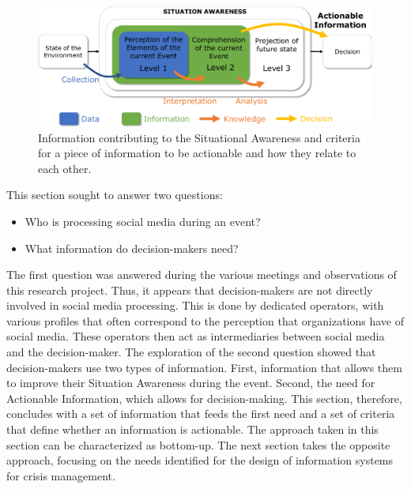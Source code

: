 \begin{figure}[htb]
    \centering
    \includegraphics[width=\textwidth]{figures/chap-3/inf-need-dm.pdf}
    \caption{Information contributing to the Situational Awareness and criteria for a piece of information to be actionable and how they relate to each other.}
    \label{information:sa-inf}
\end{figure}

This section sought to answer two questions:

\begin{itemize}
    \item Who is processing social media during an event?
    \item What information do decision-makers need?
\end{itemize}

The first question was answered during the various meetings and observations of this research project.
Thus, it appears that decision-makers are not directly involved in social media processing.
This is done by dedicated operators, with various profiles that often correspond to the perception that organizations have of social media.
These operators then act as intermediaries between social media and the decision-maker.
The exploration of the second question showed that decision-makers use two types of information.
First, information that allows them to improve their Situation Awareness during the event.
Second, the need for Actionable Information, which allows for decision-making.
This section, therefore, concludes with a set of information that feeds the first need and a set of criteria that define whether an information is actionable.
The approach taken in this section can be characterized as bottom-up.
The next section takes the opposite approach, focusing on the needs identified for the design of information systems for crisis management.

